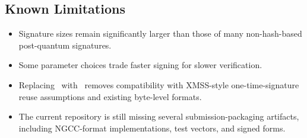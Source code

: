 \subsection{Known Limitations}

\begin{itemize}
    \item Signature sizes remain significantly larger than those of many non-hash-based post-quantum signatures.
    \item Some parameter choices trade faster signing for slower verification.
    \item Replacing \WOTSP\ with \WOTSCS\ removes compatibility with XMSS-style one-time-signature reuse assumptions and existing byte-level formats.
    \item The current repository is still missing several submission-packaging artifacts, including NGCC-format implementations, test vectors, and signed forms.
\end{itemize}
